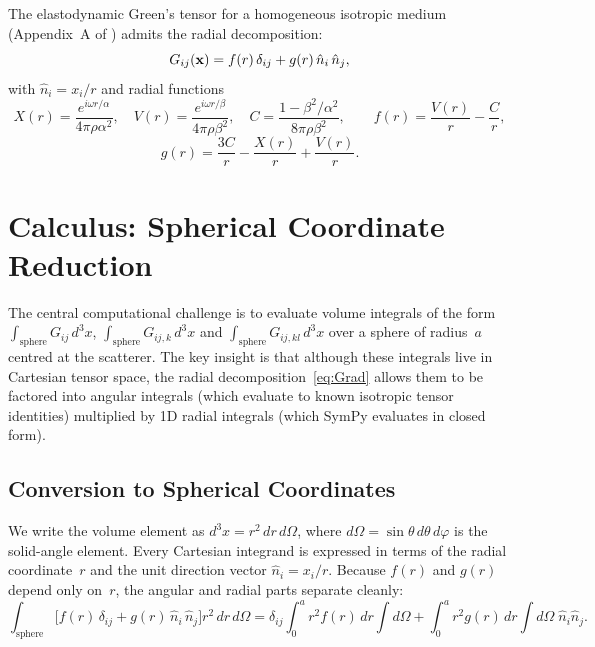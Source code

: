 The elastodynamic Green's tensor for a homogeneous isotropic medium
(Appendix~A of \citealt{Shekhar2024}) admits the radial decomposition:
\begin{equation}
  G_{ij}(\mathbf{x}) = f(r)\,\delta_{ij} + g(r)\,\hat{n}_i\,\hat{n}_j,
\label{eq:Grad}
\end{equation}
with $\hat{n}_i = x_i/r$ and radial functions
\begin{equation}
  X(r) = \frac{e^{i\omega r/\alpha}}{4\pi\rho\alpha^2}, \quad
  V(r) = \frac{e^{i\omega r/\beta}}{4\pi\rho\beta^2}, \quad
  C = \frac{1-\beta^2/\alpha^2}{8\pi\rho\beta^2},
  \qquad
  f(r) = \frac{V(r)}{r} - \frac{C}{r},
\label{eq:fdef}
\end{equation}
\begin{equation}
  g(r) = \frac{3C}{r} - \frac{X(r)}{r} + \frac{V(r)}{r} .
\label{eq:gdef}
\end{equation}


\section{Calculus: Spherical Coordinate Reduction}

The central computational challenge is to evaluate volume integrals of the
form $\int_{\text{sphere}} G_{ij}\,d^3x$,
$\int_{\text{sphere}} G_{ij,k}\,d^3x$ and
$\int_{\text{sphere}} G_{ij,kl}\,d^3x$ over a sphere of radius~$a$ centred
at the scatterer.  The key insight is that although these integrals live in
Cartesian tensor space, the radial decomposition~\eqref{eq:Grad} allows them
to be factored into angular integrals (which evaluate to known isotropic
tensor identities) multiplied by 1D radial integrals (which SymPy evaluates
in closed form).

\subsection{Conversion to Spherical Coordinates}

We write the volume element as $d^3x = r^2\,dr\,d\Omega$, where
$d\Omega = \sin\theta\,d\theta\,d\varphi$ is the solid-angle element.  Every
Cartesian integrand is expressed in terms of the radial coordinate~$r$ and
the unit direction vector $\hat{n}_i = x_i/r$.  Because $f(r)$ and $g(r)$
depend only on~$r$, the angular and radial parts separate cleanly:
\begin{equation}
  \int_{\text{sphere}}
    \bigl[f(r)\,\delta_{ij} + g(r)\,\hat{n}_i\,\hat{n}_j\bigr]
    r^2\,dr\,d\Omega
  = \delta_{ij}\int_0^a r^2 f(r)\,dr \int d\Omega
  + \int_0^a r^2 g(r)\,dr \int d\Omega\;\hat{n}_i\hat{n}_j.
\label{eq:sphfact}
\end{equation}

